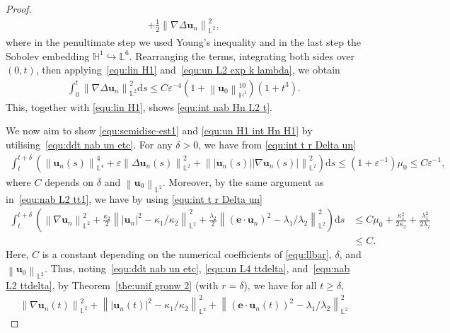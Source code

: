 \documentclass[11pt, reqno]{amsart}
\theoremstyle{definition}
\numberwithin{equation}{section}
\newcommand{\bff}{\boldsymbol}
\newcommand{\bb}{\mathbb}
\newcommand{\ds}{\mathrm{d}s}
\newcommand{\norm}[2]{\left\|{#1}\right\|_{#2}}
\begin{document}
\begin{proof}
\begin{align}
		+
		\frac{1}{2} \norm{\nabla \Delta \bff{u}_n}{\bb{L}^2}^2,
	\end{align}
	where in the penultimate step we used Young's inequality and in the last step the Sobolev embedding $\bb{H}^1\hookrightarrow \bb{L}^6$. Rearranging the terms, integrating both sides over $(0,t)$, then applying~\eqref{equ:lin H1} and~\eqref{equ:un L2 exp k lambda}, we obtain
    \begin{align*}
        \int_0^t \norm{\nabla \Delta \bff{u}_n}{\bb{L}^2}^2 \ds
        \leq
        C\varepsilon^{-4}  \left(1+ \norm{\bff{u}_0}{\bb{H}^1}^{10}\right) \left(1+t^3\right).
    \end{align*}
    This, together with \eqref{equ:lin H1}, shows \eqref{equ:int nab Hn L2 t}.
    
	We now aim to show \eqref{equ:semidisc-est1} and \eqref{equ:un H1 int Hn H1} by utilising~\eqref{equ:ddt nab un etc}. For any $\delta>0$, we have from \eqref{equ:int t r Delta un}
    \begin{align}\label{equ:un L4 ttdelta}
    \int_t^{t+\delta} \left(\norm{\bff{u}_n(s)}{\bb{L}^4}^4 + \varepsilon \norm{\Delta \bff{u}_n(s)}{\bb{L}^2}^2 + \norm{|\bff{u}_n(s)| |\nabla \bff{u}_n(s)|}{\bb{L}^2}^2 \right) \ds 
    \leq (1+\varepsilon^{-1}) \mu_0
    \leq 
    C\varepsilon^{-1},
    \end{align}
    where $C$ depends on $\delta$ and $\norm{\bff{u}_0}{\bb{L}^2}$.
Moreover, by the same argument as in~\eqref{equ:nab L2 tt1}, we have by using \eqref{equ:int t r Delta un}
\begin{align}\label{equ:nab L2 ttdelta}
    \int_t^{t+\delta} \left(
		\norm{\nabla \bff{u}_n}{\bb{L}^2}^2
        +
        \frac{\kappa_2}{2} \norm{ |\bff{u}_n|^2 - \kappa_1/\kappa_2}{\bb{L}^2}^2
        +
        \frac{\lambda_2}{2} \norm{(\bff{e}\cdot \bff{u}_n)^2- \lambda_1/\lambda_2}{\bb{L}^2}^2 \right) \ds
     &\leq
     C\mu_0+ \frac{\kappa_1^2}{2\kappa_2}+ \frac{\lambda_1^2}{2\lambda_2}
     \nonumber \\
     &\leq C.
\end{align}
 Here, $C$ is a constant depending on the numerical coefficients of \eqref{equ:llbar}, $\delta$, and $\norm{\bff{u}_0}{\bb{L}^2}$.
Thus, noting~\eqref{equ:ddt nab un etc}, \eqref{equ:un L4 ttdelta}, and~\eqref{equ:nab L2 ttdelta}, by Theorem~\ref{the:unif gronw 2} (with $r=\delta$), we have for all $t\geq \delta$,
	\begin{align}\label{equ:un H1 C}
		\norm{\nabla\bff{u}_n(t)}{\bb{L}^2}^2 + \norm{ |\bff{u}_n(t)|^2 - \kappa_1/\kappa_2}{\bb{L}^2}^2  + \norm{(\bff{e}\cdot \bff{u}_n(t))^2- \lambda_1/\lambda_2}{\bb{L}^2}^2

\end{align}
\end{proof}
\end{document}
